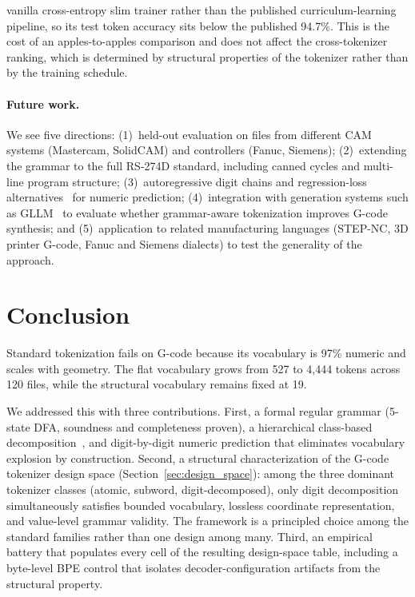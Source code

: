\documentclass[11pt]{article}
\begin{document}
vanilla cross-entropy slim trainer rather than the published curriculum-learning pipeline, so its test token accuracy sits below the published 94.7\%. This is the cost of an apples-to-apples comparison and does not affect the cross-tokenizer ranking, which is determined by structural properties of the tokenizer rather than by the training schedule.

\paragraph{Future work.}
We see five directions: (1)~held-out evaluation on files from different CAM systems (Mastercam, SolidCAM) and controllers (Fanuc, Siemens); (2)~extending the grammar to the full RS-274D standard, including canned cycles and multi-line program structure; (3)~autoregressive digit chains and regression-loss alternatives~\cite{regress_dont_guess} for numeric prediction; (4)~integration with generation systems such as GLLM~\cite{gllm} to evaluate whether grammar-aware tokenization improves G-code synthesis; and (5)~application to related manufacturing languages (STEP-NC, 3D printer G-code, Fanuc and Siemens dialects) to test the generality of the approach.

\section{Conclusion}
\label{sec:conclusion}

Standard tokenization fails on G-code because its vocabulary is 97\% numeric and scales with geometry. The flat vocabulary grows from 527 to 4{,}444 tokens across 120 files, while the structural vocabulary remains fixed at 19.

We addressed this with three contributions. First, a formal regular grammar (5-state DFA, soundness and completeness proven), a hierarchical class-based decomposition~\cite{brown_classlm}, and digit-by-digit numeric prediction that eliminates vocabulary explosion by construction. Second, a structural characterization of the G-code tokenizer design space (Section~\ref{sec:design_space}): among the three dominant tokenizer classes (atomic, subword, digit-decomposed), only digit decomposition simultaneously satisfies bounded vocabulary, lossless coordinate representation, and value-level grammar validity. The framework is a principled choice among the standard families rather than one design among many. Third, an empirical battery that populates every cell of the resulting design-space table, including a byte-level BPE control that isolates decoder-configuration artifacts from the structural property.
\end{document}
